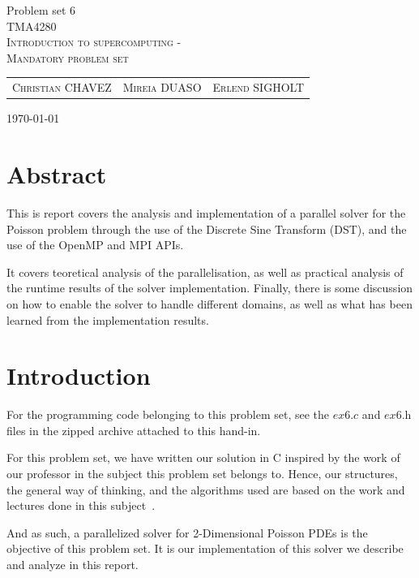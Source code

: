 \documentclass[fontsize=11pt,paper=a4,titlepage]{article}
\begin{document}
\begin{center}


{\huge Problem set 6}\\[0.5cm]

\textsc{\LARGE TMA4280}\\[0.5cm]
\textsc{\large Introduction to supercomputing -}\\
\textsc{\large Mandatory problem set}\\[0.6cm]

\begin{table}[h]
\centering
\begin{tabular}{ccc}
	\textsc{Christian CHAVEZ} & \textsc{Mireia DUASO} & \textsc{Erlend SIGHOLT}
\end{tabular}
\end{table}

\large{\today}
\vfill
\section*{Abstract}
This is report covers the analysis and implementation of a parallel solver for the Poisson problem through the use of the Discrete Sine Transform (DST), and the use of the OpenMP and MPI APIs.

It covers teoretical analysis of the parallelisation, as well as practical analysis of the runtime results of the solver implementation. Finally, there is some discussion on how to enable the solver to handle different domains, as well as what has been learned from the implementation results.
\end{center}
  

\clearpage
\section{Introduction}

For the programming code belonging to this problem set, see the $\textit{ex6.c}$
and $\textit{ex6.h}$ files in the zipped archive attached to this hand-in.

For this problem set, we have written our solution in C inspired by the work of
our professor in the subject this problem set belongs to. Hence, our structures,
the general way of thinking, and the algorithms used are based on the work and
lectures done in this subject~\cite{tma4280}.

And as such, a parallelized solver for 2-Dimensional Poisson PDEs is the
objective of this problem set. It is our implementation of this solver we
describe and analyze in this report.
\end{document}

